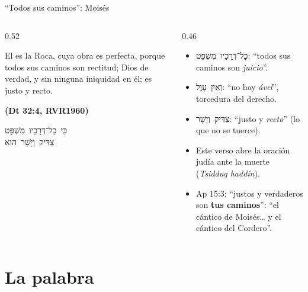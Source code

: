 \documentclass[hyperref={bookmarks=false},aspectratio=169]{beamer}
\newcommand{\heb}[1]{\mbox{\foreignlanguage{hebrew}{#1}}}
\newcommand{\fuente}[1]{\par\hfill{\upshape\bfseries\footnotesize\textcolor{azul}{#1}}}
\newcommand{\destacar}[1]{\textbf{\textcolor{azul}{#1}}}
\begin{document}
\begin{frame}{``Todos sus caminos'': Moisés}
\begin{columns}[c,onlytextwidth]
\begin{column}{0.52\textwidth}
\begin{cita}El es la Roca, cuya obra es perfecta, porque todos sus caminos son rectitud; Dios de verdad, y sin ninguna iniquidad en él; es justo y recto.\fuente{(Dt 32:4, RVR1960)}\end{cita}
\begin{center}\small\heb{כִּי כָל־דְּרָכָיו מִשְׁפָּט}\\\heb{צַדִּיק וְיָשָׁר הוּא}\end{center}
\end{column}
\begin{column}{0.46\textwidth}\scriptsize
\begin{itemize}
\item \heb{כָל־דְּרָכָיו מִשְׁפָּט}: ``todos sus caminos son \emph{juicio}''.
\item \heb{וְאֵין עָוֶל}: ``no hay \emph{ável}'', torcedura del derecho.
\item \heb{צַדִּיק וְיָשָׁר}: ``justo y \emph{recto}'' (lo que no se tuerce).
\item Este verso abre la oración judía ante la muerte (\emph{Tsidduq haddín}).
\item Ap 15:3: ``justos y verdaderos son \destacar{tus caminos}'': ``el cántico de Moisés\ldots{} y el cántico del Cordero''.
\end{itemize}
\end{column}
\end{columns}
\end{frame}

\section{La palabra}
\end{document}
